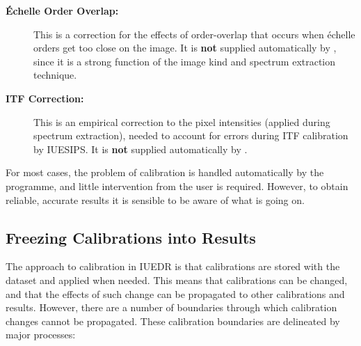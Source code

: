 \begin{description}
\item [{\bf \'{E}chelle Order Overlap:}]
      This is a correction for the effects of
      order-overlap that occurs when \'{e}chelle orders get too close on the
      image.  It is {\bf not} supplied automatically by
      , since
      it is a strong function of the image kind and spectrum extraction
      technique.

\item [{\bf ITF Correction:}]
      This is an empirical correction to the pixel
      intensities (applied during spectrum extraction), needed to account for
      errors during ITF calibration by IUESIPS.  It is {\bf not} supplied
      automatically by \@.

\end{description}

For most cases, the problem of calibration is handled automatically by the
programme, and little intervention from the user is required.  However, to
obtain reliable, accurate results it is sensible to be aware of what is
going on.


\subsection{Freezing Calibrations into Results}

The approach to calibration in IUEDR is that calibrations are stored with
the dataset and applied when needed.  This means that calibrations
can be changed, and that the effects of such change can be propagated to
other calibrations and results.  However, there are a number of boundaries
through which calibration changes cannot be propagated.  These
calibration boundaries are delineated by major processes:

